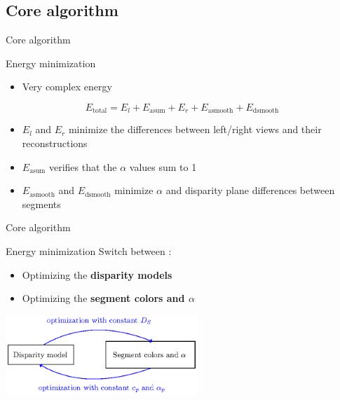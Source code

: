 \documentclass[12pt]{beamer}
\newcommand{\tmop}[1]{\ensuremath{\operatorname{#1}}}
\begin{document}
\subsection{Core algorithm}

\begin{frame}{Core algorithm}
  \begin{block}{Energy minimization}
    \begin{itemize}
      \item Very complex energy
    \end{itemize}

    \[ E_{\tmop{total}} = E_l + E_{\tmop{asum}} + E_r + E_{\tmop{asmooth}} +
       E_{\tmop{dsmooth}} \]

    \begin{itemize}
      \item $E_l$ and $E_r$ minimize the differences between left/right views and their reconstructions
      
      \item $E_{\tmop{asum}}$ verifies that the $\alpha$ values sum to 1
      
      \item $E_{\tmop{asmooth}}$ and $E_{\tmop{dsmooth}}$ minimize
      $\alpha$ and disparity plane differences between segments
    \end{itemize}
  \end{block}
\end{frame}

\begin{frame}{Core algorithm}
  \begin{block}{Energy minimization}
    Switch between :
    \begin{itemize}
      \item Optimizing the \textbf{disparity models}
      \item Optimizing the \textbf{segment colors and $\alpha$}
    \end{itemize}
  \end{block}

  \begin{center}
    \includegraphics[height=3cm]{graphics/warpmat-core-algorithm.eps}
  \end{center}
\end{frame}
\end{document}
